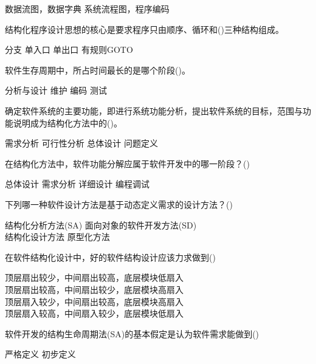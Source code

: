 \documentclass[answers]{exam}
\begin{document}
\begin{questions}
\begin{oneparchoices}
		\correctchoice 数据流图，数据字典
		\choice 系统流程图，程序编码
	\end{oneparchoices}
	\question 结构化程序设计思想的核心是要求程序只由顺序、循环和()三种结构组成。\\
	\begin{oneparchoices}
		\correctchoice 分支
		\choice 单入口
		\choice 单出口
		\choice 有规则GOTO
	\end{oneparchoices}
	\question 软件生存周期中，所占时间最长的是哪个阶段()。\\
	\begin{oneparchoices}
		\choice 分析与设计
		\correctchoice 维护
		\choice 编码
		\choice 测试
	\end{oneparchoices}
	\question 确定软件系统的主要功能，即进行系统功能分析，提出软件系统的目标，范围与功能说明成为结构化方法中的()。\\
	\begin{oneparchoices}
		\correctchoice 需求分析
		\choice 可行性分析
		\choice 总体设计
		\choice 问题定义
	\end{oneparchoices}
	\question 在结构化方法中，软件功能分解应属于软件开发中的哪一阶段？()\\
	\begin{oneparchoices}
		\correctchoice 总体设计
		\choice 需求分析
		\choice 详细设计
		\choice 编程调试
	\end{oneparchoices}
	\question 下列哪一种软件设计方法是基于动态定义需求的设计方法？()\\
	\begin{oneparchoices}
		\choice 结构化分析方法(SA)
		\correctchoice 面向对象的软件开发方法(SD)\\
		\choice 结构化设计方法
		\choice 原型化方法
	\end{oneparchoices}
	\question 在软件结构化设计中，好的软件结构设计应该力求做到()\\
	\begin{oneparchoices}
		\choice 顶层扇出较少，中间扇出较高，底层模块低扇入\\
		\correctchoice 顶层扇出较高，中间扇出较少，底层模块高扇入\\
		\choice 顶层扇入较少，中间扇出较高，底层模块高扇入\\
		\choice 顶层扇入较高，中间扇入较少，底层模块低扇入
	\end{oneparchoices}
	\question 软件开发的结构生命周期法(SA)的基本假定是认为软件需求能做到()\\
	\begin{oneparchoices}
		\correctchoice 严格定义
		\choice 初步定义

\end{oneparchoices}
\end{questions}
\end{document}
